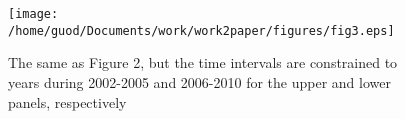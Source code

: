 \documentclass[draft, grl]{/home/guod/Documents/template/agu_template/AGUTeX}
\begin{document}
\begin{figure}
    \centering
    \noindent\texttt{[image: /home/guod/Documents/work/work2paper/figures/fig3.eps]}
    \caption{The same as Figure 2, but the time intervals are constrained to years during 2002-2005 
    and 2006-2010 for the upper and lower panels, respectively}
    \label{figure3}
\end{figure}

\end{document}
